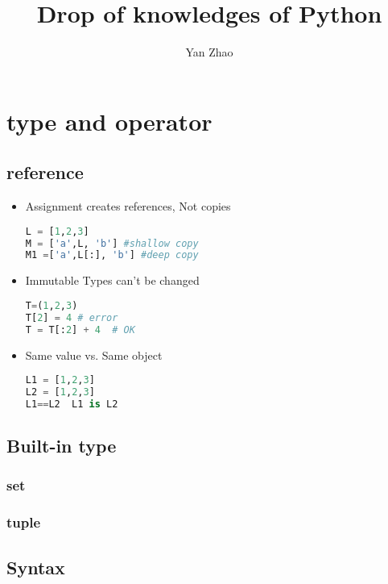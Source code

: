 \documentclass[a4paper,12pt,twoside]{book}
\begin{document}

\title{Drop of knowledges of Python}
\author{Yan Zhao}
\date{}\maketitle


	
\chapter{type and operator}
\section{reference}
\begin{itemize}
	\item Assignment creates references, Not copies
\begin{lstlisting}[frame=single, language=Python]
L = [1,2,3]
M = ['a',L, 'b'] #shallow copy
M1 =['a',L[:], 'b'] #deep copy
\end{lstlisting}  
	\item Immutable Types can't be changed
\begin{lstlisting}[frame=single, language=Python]
T=(1,2,3)
T[2] = 4 # error
T = T[:2] + 4  # OK
\end{lstlisting}  
	\item Same value vs. Same object
\begin{lstlisting}[frame=single, language=Python]
L1 = [1,2,3]
L2 = [1,2,3]
L1==L2  L1 is L2
\end{lstlisting}  
\end{itemize}

\section{Built-in type}
\subsection{set}
\subsection{tuple}


\section{Syntax}
\end{document}

